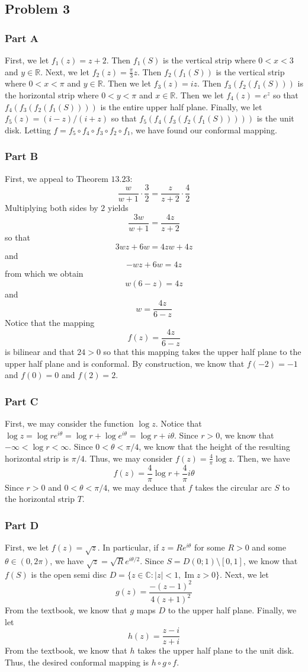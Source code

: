 \documentclass[12pt]{article}
\newcommand{\cc}{{\mathbb C}}
\newcommand{\rr}{{\mathbb R}}
\DeclareMathOperator{\imag}{Im}
\begin{document}
\subsection*{Problem 3}
\subsubsection*{Part A}
First, we let $f_1(z) = z+2$. Then $f_1(S)$ is the vertical strip where $0 < x < 3$ and $y \in \rr$. Next, we let $f_2(z) = \frac{\pi}{3}z$. Then $f_2(f_1(S))$ is the vertical strip where $0 < x < \pi$ and $y \in \rr$. Then we let $f_3(z) = iz$. Then $f_3(f_2(f_1(S)))$ is the horizontal strip where $0 < y < \pi$ and $x \in \rr$. Then we let $f_4(z) = e^z$ so that $f_4(f_3(f_2(f_1(S))))$ is the entire upper half plane. Finally, we let $f_5(z) = (i-z)/(i+z)$ so that $f_5(f_4(f_3(f_2(f_1(S)))))$ is the unit disk. Letting $f = f_5 \circ f_4 \circ f_3 \circ f_2 \circ f_1$, we have found our conformal mapping.
\subsubsection*{Part B}
First, we appeal to Theorem $13.23$:
\[
\frac{w}{w+1} \cdot \frac{3}{2} = \frac{z}{z+2} \cdot \frac{4}{2}
\] Multiplying both sides by $2$ yields
\[
\frac{3w}{w+1} = \frac{4z}{z+2}
\] so that
\[
3wz + 6w = 4zw + 4z
\] and
\[
-wz + 6w = 4z
\] from which we obtain
\[
w(6-z) = 4z
\] and
\[
w = \frac{4z}{6-z}
\] Notice that the mapping 
\[
f(z) = \frac{4z}{6-z} 
\] is bilinear and that $24 > 0$ so that this mapping takes the upper half plane to the upper half plane and is conformal. By construction, we know that $f(-2) = -1$ and $f(0) = 0$ and $f(2) = 2$.
\subsubsection*{Part C}
First, we may consider the function $\log z$. Notice that $\log z = \log re^{i\theta} = \log r + \log e^{i\theta} = \log r + i \theta$. Since $r > 0$, we know that $-\infty < \log r < \infty$. Since $0 < \theta < \pi / 4$, we know that the height of the resulting horizontal strip is $\pi / 4$. Thus, we may consider $f(z) = \frac{4}{\pi} \log z$. Then, we have
\[
f(z) = \frac{4}{\pi} \log r + \frac{4}{\pi} i \theta
\] Since $r > 0$ and $0 < \theta < \pi/4$, we may deduce that $f$ takes the circular arc $S$ to the horizontal strip $T$.
\subsubsection*{Part D}
First, we let $f(z) = \sqrt{z}$. In particular, if $z = Re^{i\theta}$ for some $R > 0$ and some $\theta \in (0, 2\pi)$, we have $\sqrt{z} = \sqrt{R}e^{i\theta/2}$. Since $S = D(0;1) \setminus [0,1]$, we know that $f(S)$ is the open semi disc $D = \{z \in \cc: \vert z \vert < 1, \imag z > 0 \}$. Next, we let
\[
g(z) = \frac{-(z-1)^2}{4(z+1)^2}
\] From the textbook, we know that $g$ maps $D$ to the upper half plane. Finally, we let
\[
h(z) = \frac{z - i}{z + i}
\] From the textbook, we know that $h$ takes the upper half plane to the unit disk. Thus, the desired conformal mapping is $h \circ g \circ f$.
\newpage
\end{document}
